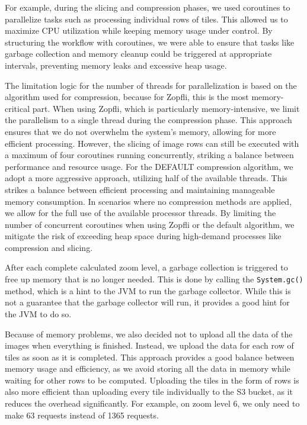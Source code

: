 For example, during the slicing and compression phases, we used coroutines to parallelize tasks such as processing individual rows of tiles. This allowed us to maximize CPU utilization while keeping memory usage under control. By structuring the workflow with coroutines, we were able to ensure that tasks like garbage collection and memory cleanup could be triggered at appropriate intervals, preventing memory leaks and excessive heap usage.

The limitation logic for the number of threads for parallelization is based on the algorithm used for compression, because for Zopfli, this is the most memory-critical part. When using Zopfli, which is particularly memory-intensive, we limit the parallelism to a single thread during the compression phase. This approach ensures that we do not overwhelm the system's memory, allowing for more efficient processing. However, the slicing of image rows can still be executed with a maximum of four coroutines running concurrently, striking a balance between performance and resource usage. For the DEFAULT compression algorithm, we adopt a more aggressive approach, utilizing half of the available threads. This strikes a balance between efficient processing and maintaining manageable memory consumption. In scenarios where no compression methods are applied, we allow for the full use of the available processor threads. By limiting the number of concurrent coroutines when using Zopfli or the default algorithm, we mitigate the risk of exceeding heap space during high-demand processes like compression and slicing.

After each complete calculated zoom level, a garbage collection is triggered to free up memory that is no longer needed. This is done by calling the \texttt{System.gc()} method, which is a hint to the JVM to run the garbage collector. While this is not a guarantee that the garbage collector will run, it provides a good hint for the JVM to do so.

Because of memory problems, we also decided not to upload all the data of the images when everything is finished. Instead, we upload the data for each row of tiles as soon as it is completed. This approach provides a good balance between memory usage and efficiency, as we avoid storing all the data in memory while waiting for other rows to be computed. Uploading the tiles in the form of rows is also more efficient than uploading every tile individually to the S3 bucket, as it reduces the overhead significantly. For example, on zoom level 6, we only need to make 63 requests instead of 1365 requests.